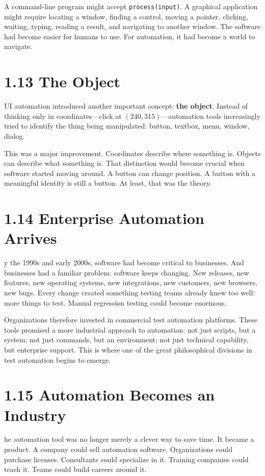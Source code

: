\documentclass[11pt, a4paper, openany]{book}
\newcommand{\initialcap}[1]{{\fontfamily{lmss}\selectfont\huge\textbf{#1}}}
\begin{document}
A command-line program might accept \texttt{process(input)}. A graphical application might require locating a window, finding a control, moving a pointer, clicking, waiting, typing, reading a result, and navigating to another window. The software had become easier for humans to use. For automation, it had become a world to navigate.

\section{1.13 The Object}
\noindent \initialcap{G}UI automation introduced another important concept: \textbf{the object}. Instead of thinking only in coordinates---click at $(240, 315)$---automation tools increasingly tried to identify the thing being manipulated: button, textbox, menu, window, dialog.

This was a major improvement. Coordinates describe where something is. Objects can describe what something is. That distinction would become crucial when software started moving around. A button can change position. A button with a meaningful identity is still a button. At least, that was the theory.

\section{1.14 Enterprise Automation Arrives}
\noindent \initialcap{B}y the 1990s and early 2000s, software had become critical to businesses. And businesses had a familiar problem: software keeps changing. New releases, new features, new operating systems, new integrations, new customers, new browsers, new bugs. Every change created something testing teams already knew too well: more things to test. Manual regression testing could become enormous.

Organizations therefore invested in commercial test automation platforms. These tools promised a more industrial approach to automation: not just scripts, but a system; not just commands, but an environment; not just technical capability, but enterprise support. This is where one of the great philosophical divisions in test automation begins to emerge.

\section{1.15 Automation Becomes an Industry}
\noindent \initialcap{T}he automation tool was no longer merely a clever way to save time. It became a product. A company could sell automation software. Organizations could purchase licenses. Consultants could specialize in it. Training companies could teach it. Teams could build careers around it.
\end{document}
